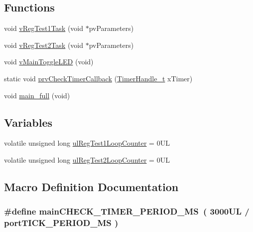 \subsection*{Functions}
\begin{DoxyCompactItemize}
\item 
void \hyperlink{main-full_8c_ac74fa6a6daa601cc0e19aa005741098f}{v\+Reg\+Test1\+Task} (void $\ast$pv\+Parameters)
\item 
void \hyperlink{main-full_8c_a67651971ac887379bee86df2f1ae2d0f}{v\+Reg\+Test2\+Task} (void $\ast$pv\+Parameters)
\item 
void \hyperlink{main-full_8c_a3243ee39821b6327d3f48c1eefd36e17}{v\+Main\+Toggle\+L\+ED} (void)
\item 
static void \hyperlink{main-full_8c_a70746c26983138c45fef3c7c1454b436}{prv\+Check\+Timer\+Callback} (\hyperlink{timers_8h_aae4bf1dce696ab615d5fd073606fd3cb}{Timer\+Handle\+\_\+t} x\+Timer)
\item 
void \hyperlink{main-full_8c_a6fd46262e1bf48ba9cc32c008057a2c1}{main\+\_\+full} (void)
\end{DoxyCompactItemize}
\subsection*{Variables}
\begin{DoxyCompactItemize}
\item 
volatile unsigned long \hyperlink{main-full_8c_a13c57287e1961b7a14e4a5372d0b92cf}{ul\+Reg\+Test1\+Loop\+Counter} = 0\+UL
\item 
volatile unsigned long \hyperlink{main-full_8c_a7193501ad9ce12809d8d16225985792d}{ul\+Reg\+Test2\+Loop\+Counter} = 0\+UL
\end{DoxyCompactItemize}


\subsection{Macro Definition Documentation}
\subsubsection[{\texorpdfstring{main\+C\+H\+E\+C\+K\+\_\+\+T\+I\+M\+E\+R\+\_\+\+P\+E\+R\+I\+O\+D\+\_\+\+MS}{mainCHECK_TIMER_PERIOD_MS}}]{\setlength{\rightskip}{0pt plus 5cm}\#define main\+C\+H\+E\+C\+K\+\_\+\+T\+I\+M\+E\+R\+\_\+\+P\+E\+R\+I\+O\+D\+\_\+\+MS~( 3000\+U\+L / port\+T\+I\+C\+K\+\_\+\+P\+E\+R\+I\+O\+D\+\_\+\+M\+S )}\hypertarget{main-full_8c_afa612487486b4303046802549315dbb7}{}\label{main-full_8c_afa612487486b4303046802549315dbb7}


